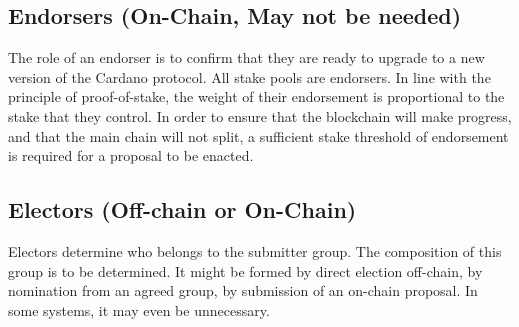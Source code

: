 \subsection{Endorsers (On-Chain, May not be needed)}

The role of an endorser is to confirm that they are ready to upgrade to a new
version of the Cardano protocol.  All stake pools are endorsers.  In line with
the principle of proof-of-stake, the weight of their endorsement is proportional
to the stake that they control.  In order to ensure that the blockchain will
make progress, and that the main chain will not split, a sufficient stake
threshold of endorsement is required for a proposal to be enacted.

\subsection{Electors (Off-chain or On-Chain)}

Electors determine who belongs to the submitter group.  The composition of this group is to be determined.  It might be formed by direct election off-chain, by
nomination from an agreed group, by submission of an on-chain proposal.  In some systems, it may even be unnecessary.
